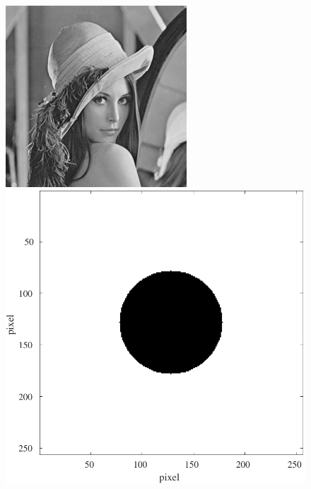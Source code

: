 \begin{figure}[H]
    \centering
    \begin{minipage}[b]{.23\textwidth}
        \centering
        \includegraphics[keepaspectratio,width=\textwidth]{../../LENNA.jpeg}
    \end{minipage}
    \begin{minipage}[b]{.23\textwidth}
        \centering
        \includegraphics[keepaspectratio,width=\textwidth]{../../Figures/08_41_filter.pdf}

\end{minipage}
\end{figure}
